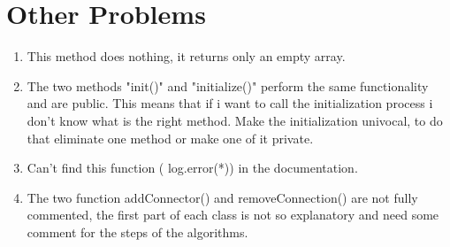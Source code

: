 \documentclass[../../dd.tex]{subfiles}
\begin{document}
	\chapter{Other Problems}
	
	\begin{enumerate}
	
	

	\item 
	

	This method does nothing, it returns only an empty array.
	
	\item The two methods "init()" and "initialize()" perform the same functionality and are public. This means that if i want to call the initialization process i don't know what is the right method. Make the initialization univocal, to do that eliminate one method or make one of it private.
	
\item 
 
	
	Can't find this function ( log.error(*)) in the documentation.
	
\item	The two function addConnector() and removeConnection() are not fully commented, the first part of each class is not so explanatory and need some comment for the steps of the algorithms.
	
	
\end{enumerate}
\end{document}
